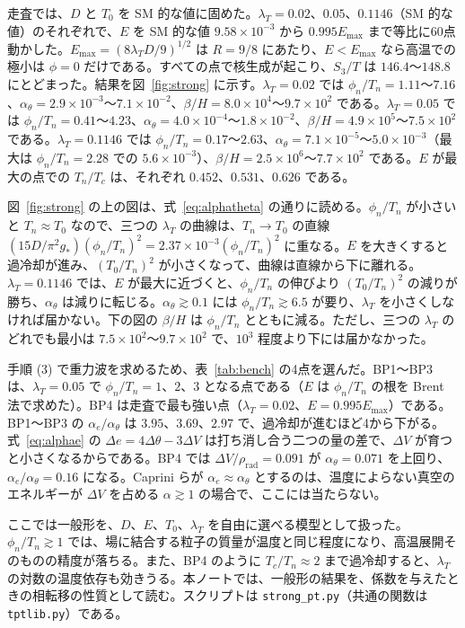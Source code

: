 \documentclass[a4paper,10pt]{ltjsarticle}
\begin{document}
走査では、$D$ と $T_0$ を SM 的な値に固めた。$\lambda_T=0.02$、$0.05$、$0.1146$（SM 的な値）のそれぞれで、$E$ を SM 的な値 $9.58\times10^{-3}$ から $0.995E_{\max}$ まで等比に60点動かした。$E_{\max}=(8\lambda_TD/9)^{1/2}$ は $R=9/8$ にあたり、$E<E_{\max}$ なら高温での極小は $\phi=0$ だけである。すべての点で核生成が起こり、$S_3/T$ は $146.4$〜$148.8$ にとどまった。結果を図~\ref{fig:strong} に示す。$\lambda_T=0.02$ では $\phi_n/T_n=1.11$〜$7.16$、$\alpha_\theta=2.9\times10^{-3}$〜$7.1\times10^{-2}$、$\beta/H=8.0\times10^4$〜$9.7\times10^2$ である。$\lambda_T=0.05$ では $\phi_n/T_n=0.41$〜$4.23$、$\alpha_\theta=4.0\times10^{-4}$〜$1.8\times10^{-2}$、$\beta/H=4.9\times10^5$〜$7.5\times10^2$ である。$\lambda_T=0.1146$ では $\phi_n/T_n=0.17$〜$2.63$、$\alpha_\theta=7.1\times10^{-5}$〜$5.0\times10^{-3}$（最大は $\phi_n/T_n=2.28$ での $5.6\times10^{-3}$）、$\beta/H=2.5\times10^6$〜$7.7\times10^2$ である。$E$ が最大の点での $T_n/T_c$ は、それぞれ $0.452$、$0.531$、$0.626$ である。

図~\ref{fig:strong} の上の図は、式~\eqref{eq:alphatheta} の通りに読める。$\phi_n/T_n$ が小さいと $T_n\approx T_0$ なので、三つの $\lambda_T$ の曲線は、$T_n\to T_0$ の直線 $(15D/\pi^2g_*)(\phi_n/T_n)^2=2.37\times10^{-3}(\phi_n/T_n)^2$ に重なる。$E$ を大きくすると過冷却が進み、$(T_0/T_n)^2$ が小さくなって、曲線は直線から下に離れる。$\lambda_T=0.1146$ では、$E$ が最大に近づくと、$\phi_n/T_n$ の伸びより $(T_0/T_n)^2$ の減りが勝ち、$\alpha_\theta$ は減りに転じる。$\alpha_\theta\gtrsim0.1$ には $\phi_n/T_n\gtrsim6.5$ が要り、$\lambda_T$ を小さくしなければ届かない。下の図の $\beta/H$ は $\phi_n/T_n$ とともに減る。ただし、三つの $\lambda_T$ のどれでも最小は $7.5\times10^2$〜$9.7\times10^2$ で、$10^3$ 程度より下には届かなかった。

手順 (3) で重力波を求めるため、表~\ref{tab:bench} の4点を選んだ。BP1〜BP3 は、$\lambda_T=0.05$ で $\phi_n/T_n=1$、$2$、$3$ となる点である（$E$ は $\phi_n/T_n$ の根を Brent 法で求めた）。BP4 は走査で最も強い点（$\lambda_T=0.02$、$E=0.995E_{\max}$）である。BP1〜BP3 の $\alpha_e/\alpha_\theta$ は $3.95$、$3.69$、$2.97$ で、過冷却が進むほど4から下がる。式~\eqref{eq:alphae} の $\Delta e=4\Delta\theta-3\Delta V$ は打ち消し合う二つの量の差で、$\Delta V$ が育つと小さくなるからである。BP4 では $\Delta V/\rho_{\mathrm{rad}}=0.091$ が $\alpha_\theta=0.071$ を上回り、$\alpha_e/\alpha_\theta=0.16$ になる。Caprini らが $\alpha_e\approx\alpha_\theta$ とするのは、温度によらない真空のエネルギーが $\Delta V$ を占める $\alpha\gtrsim1$ の場合で、ここには当たらない。

ここでは一般形を、$D$、$E$、$T_0$、$\lambda_T$ を自由に選べる模型として扱った。$\phi_n/T_n\gtrsim1$ では、場に結合する粒子の質量が温度と同じ程度になり、高温展開そのものの精度が落ちる。また、BP4 のように $T_c/T_n\approx2$ まで過冷却すると、$\lambda_T$ の対数の温度依存も効きうる。本ノートでは、一般形の結果を、係数を与えたときの相転移の性質として読む。スクリプトは \texttt{strong\_pt.py}（共通の関数は \texttt{tptlib.py}）である。
\end{document}
